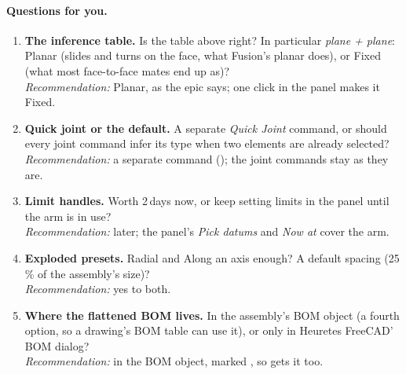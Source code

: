 \paragraph{Questions for you.}
\begin{enumerate}[label=A\arabic*.]
  \item \textbf{The inference table.} Is the table above right? In particular \emph{plane + plane}: Planar (slides and
        turns on the face, what Fusion's planar does), or Fixed (what most face-to-face mates end up as)?\\
        \emph{Recommendation:} Planar, as the epic says; one click in the panel makes it Fixed.
  \item \textbf{Quick joint or the default.} A separate \emph{Quick Joint} command, or should every joint command
        infer its type when two elements are already selected?\\
        \emph{Recommendation:} a separate command (); the joint commands stay as they are.
  \item \textbf{Limit handles.} Worth 2\,days now, or keep setting limits in the panel until the arm is in use?\\
        \emph{Recommendation:} later; the panel's \emph{Pick datums} and \emph{Now at} cover the arm.
  \item \textbf{Exploded presets.} Radial and Along an axis enough? A default spacing (25\,\% of the assembly's size)?\\
        \emph{Recommendation:} yes to both.
  \item \textbf{Where the flattened BOM lives.} In the assembly's BOM object (a fourth option, so a drawing's BOM
        table can use it), or only in Heuretes FreeCAD' BOM dialog?\\
        \emph{Recommendation:} in the BOM object, marked \code{[BW]}, so  gets it too.
\end{enumerate}
